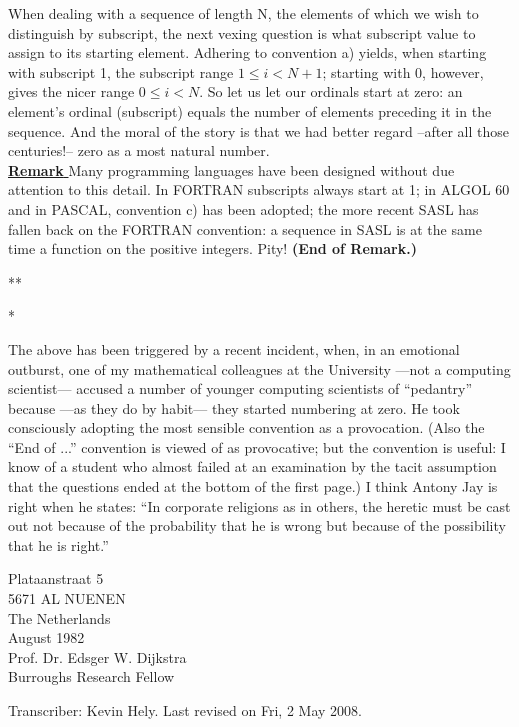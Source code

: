 \documentclass[]{article}
\begin{document}
When dealing with a sequence of length N, the elements of which we wish to distinguish by subscript, the next vexing question is what subscript value to assign to its starting element. Adhering to convention a) yields, when starting with subscript 1, the subscript range $1 \leq i < N+1$; starting with 0, however, gives the nicer range $0 \leq  i < N$. So let us let our ordinals start at zero: an element's ordinal (subscript) equals the number of elements preceding it in the sequence. And the moral of the story is that we had better regard  --after all those centuries!-- zero as a most natural number.\\

\underline{\textbf{Remark} } Many programming languages have been designed without due attention to this detail. In FORTRAN subscripts always start at 1; in ALGOL 60 and in PASCAL, convention c) has been adopted; the more recent SASL has fallen back on the FORTRAN convention: a sequence in SASL is at the same time a function on the positive integers. Pity! \textbf{(End of Remark.)}\\
\begin{center} {\centering
		*\hspace*{3.5cm}*\par
		*
	}
\end{center}

The above has been triggered by a recent incident, when, in an emotional outburst, one of my mathematical colleagues at the University —not a computing scientist— accused a number of younger computing scientists of ``pedantry'' because —as they do by habit— they started numbering at zero. He took consciously adopting the most sensible convention as a provocation. (Also the ``End of ...'' convention is viewed of as provocative; but the convention is useful: I know of a student who almost failed at an examination by the tacit assumption that the questions ended at the bottom of the first page.) I think Antony Jay is right when he states: ``In corporate religions as in others, the heretic must be cast out not because of the probability that he is wrong but because of the possibility that he is right.''

\begin{multicols}{2}
	\noindent
Plataanstraat 5\\
5671 AL NUENEN\\
The Netherlands \\		

 August 1982\\
Prof. Dr. Edsger W. Dijkstra\\
Burroughs Research Fellow

\end{multicols}

\begin{flushleft}
	Transcriber: Kevin Hely.
Last revised on Fri, 2 May 2008.
\end{flushleft}
\end{document}
